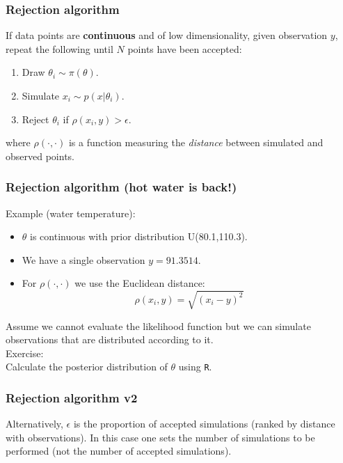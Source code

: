 \documentclass{beamer}
\newcommand{\1}{\ensuremath{\mathbf{1}}}
\begin{document}
%
%
%
\begin{frame}\frametitle{Rejection algorithm}
	If data points are \textbf{continuous} and of low dimensionality, given observation $y$, repeat the following until $N$ points have been accepted:
	\begin{enumerate}
		\item Draw $\theta_i \sim \pi(\theta)$.
		\item Simulate $x_i \sim p(x|\theta_i)$.
		\item Reject $\theta_i$ if $\rho(x_i, y)>\epsilon$.
	\end{enumerate}
	where $\rho(\cdot,\cdot)$ is a function measuring the \emph{distance} between simulated and observed points.
\end{frame}
%
%
%
\begin{frame}\frametitle{Rejection algorithm (hot water is back!)}
	Example (water temperature):
	\begin{itemize}
		\item $\theta$ is continuous with prior distribution U(80.1,110.3).
		\item We have a single observation $y = 91.3514$.
		\item For $\rho(\cdot,\cdot)$ we use the Euclidean distance:
			\begin{equation}
				\rho(x_i,y) = \sqrt{(x_i-y)^2}
			\end{equation}
	\end{itemize}
	Assume we cannot evaluate the likelihood function but we can simulate observations that are distributed according to it.\\
	Exercise:\\
	Calculate the posterior distribution of $\theta$ using \texttt{R}.
\end{frame}
%
%
%
\begin{frame}\frametitle{Rejection algorithm v2}
	Alternatively, $\epsilon$ is the proportion of accepted simulations (ranked by distance with observations). In this case one sets the number of simulations to be performed (not the number of accepted simulations).
\end{frame}
\end{document}
